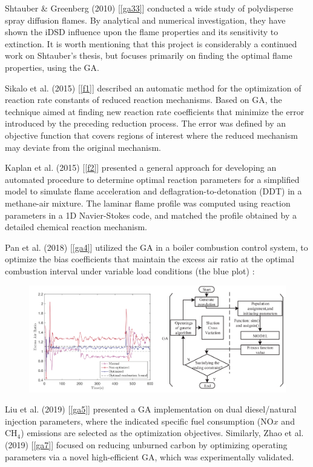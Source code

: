 \documentclass[12pt]{article}
\numberwithin{equation}{section}
\begin{document}
\begin{flushleft}
Shtauber \& Greenberg (2010) [\ref{ga33}] conducted a wide study of polydisperse
spray diffusion flames. By analytical and numerical investigation, they have shown the iDSD influence upon the flame properties and its sensitivity to extinction. It is worth mentioning that this project is considerably a continued work on Shtauber's thesis, but focuses primarily on finding the optimal flame properties, using the GA.

Sikalo et al. (2015) [\ref{f1}] described an automatic method for the optimization of reaction rate constants of reduced reaction mechanisms. Based on GA, the technique aimed at finding new reaction rate coefficients that minimize the error introduced by the preceding reduction process. The error was defined by an objective function that covers regions of interest where the reduced mechanism may deviate from the original mechanism.

Kaplan et al. (2015) [\ref{f2}] presented a general approach for developing an automated procedure to determine optimal reaction parameters for a simplified model to simulate flame acceleration and deflagration-to-detonation (DDT) in a methane-air mixture. The laminar flame profile was computed using reaction parameters in a 1D Navier-Stokes code, and matched the profile obtained by a detailed chemical reaction mechanism. 

Pan et al. (2018) [\ref{ga4}] utilized the GA in a boiler combustion control system, to optimize the bias coefficients that maintain the excess air ratio at the optimal combustion interval under variable load conditions (the blue plot) :
\begin{figure}[H]
\centering
\includegraphics[width=1.04\linewidth, center]{GA_1.png}
\end{figure}

Liu et al. (2019) [\ref{ga5}] presented a GA implementation on dual diesel/natural injection parameters, where the indicated specific fuel consumption (NO$x$ and CH$_4$) emissions are selected as the optimization objectives. Similarly, Zhao et al. (2019) [\ref{ga7}] focused on reducing unburned carbon by optimizing operating parameters via a novel high-efficient GA, which was experimentally validated.


\end{flushleft}
\end{document}
